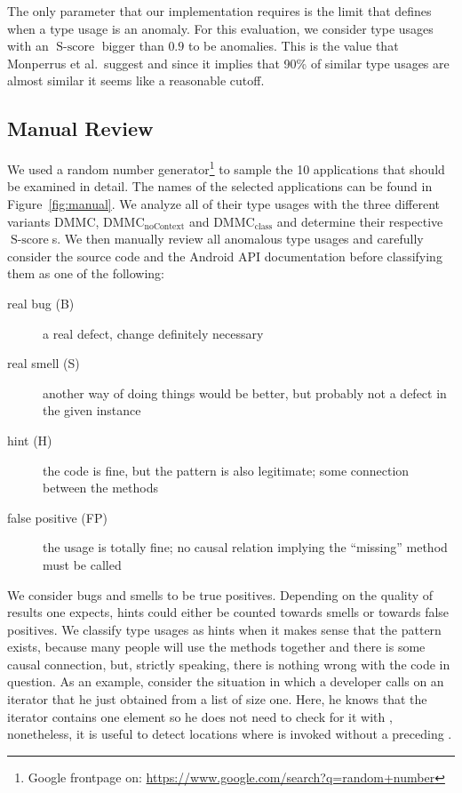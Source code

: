 The only parameter that our implementation requires is the limit that defines when a type usage is an anomaly.
For this evaluation, we consider type usages with an $\operatorname{S-score}$ bigger than $0.9$ to be anomalies.
This is the value that Monperrus et al.\ suggest and since it implies that 90\% of similar type usages are almost similar it seems like a reasonable cutoff.

\subsection{Manual Review}

We used a random number generator\footnote{Google frontpage on: \url{https://www.google.com/search?q=random+number}} to sample the 10 applications that should be examined in detail.
The names of the selected applications can be found in Figure~\ref{fig:manual}.
We analyze all of their type usages with the three different variants $\text{DMMC}$, $\text{DMMC}_{\text{noContext}}$ and $\text{DMMC}_{\text{class}}$ and determine their respective $\operatorname{S-score}$s.
We then manually review all anomalous type usages and carefully consider the source code and the Android API documentation before classifying them as one of the following:
\begin{description}
    \item [real bug (B)] a real defect, change definitely necessary
    \item [real smell (S)] another way of doing things would be better, but probably not a defect in the given instance
    \item [hint (H)] the code is fine, but the pattern is also legitimate; some connection between the methods
    \item [false positive (FP)] the usage is totally fine; no causal relation implying the ``missing'' method must be called
\end{description}


We consider bugs and smells to be true positives.
Depending on the quality of results one expects, hints could either be counted towards smells or towards false positives.
We classify type usages as hints when it makes sense that the pattern exists, because many people will use the methods together and there is some causal connection, but, strictly speaking, there is nothing wrong with the code in question.
As an example, consider the situation in which a developer calls  on an iterator that he just obtained from a list of size one.
Here, he knows that the iterator contains one element so he does not need to check for it with , nonetheless, it is useful to detect locations where  is invoked without a preceding .

